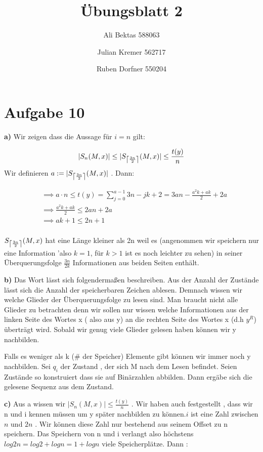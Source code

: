\documentclass{article}
\title{Übungsblatt 2}
\author{Ali Bektas 588063 \and Julian Kremer 562717 \and Ruben Dorfner 550204}
\def\mathify#1{\ifmmode{#1}\else\mbox{$#1$}\fi} %
\newcommand{\ceil}[1]{\mathify{\left\lceil {#1}\right\rceil}}
\begin{document}
\maketitle

\section*{Aufgabe 10}
\vspace{10px}
\textbf{a)} Wir zeigen dass die Aussage für $i=n$ gilt:

\[ |S_n(M,x)| \leq |S_{\ceil{\frac{3n}{2}}}(M,x)| \leq \frac{t(y)}{n}  \] 
Wir definieren $ a:=  |S_{\ceil{\frac{3n}{2}}}(M,x)|  $ . Dann:
 
\begin{align*}
	&\implies a \cdot n  \leq t(y) = \sum_{j=0}^{a-1} 3n-jk+2 = 3an - \frac{a^2k + ak}{2} + 2a \\
	&\implies \frac{a^2k +ak}{2} \leq 2an+2a \\
	&\implies ak +1 \leq 2n +1\\
\end{align*}

$S_{\ceil{\frac{3n}{2}}}(M,x) $ hat eine Länge kleiner als 2n weil es (angenommen wir speichern nur eine Information 'also $k=1$, für  $k>1$ ist es noch leichter zu sehen) in seiner Überquerungsfolge  $\frac{3n}{2k}$ Informationen aus beiden Seiten enthält.

\vspace{10px}

\textbf{b)} Das Wort lässt sich folgendermaßen beschreiben. Aus der Anzahl der Zustände lässt sich die Anzahl der speicherbaren Zeichen ablesen. Demnach wissen wir welche Glieder der Überquerungsfolge zu lesen sind. Man braucht nicht alle Glieder zu betrachten denn wir sollen nur wissen welche Informationen aus der linken Seite des Wortes x ( also aus y) an die rechten Seite des Wortes x (d.h $y^{\textit{R} }$) überträgt wird. Sobald wir genug viele Glieder gelesen haben können wir y nachbilden.

Falls es weniger als k (\# der Speicher) Elemente gibt können wir immer noch y nachbilden. Sei $q_i$ der Zustand , der sich M nach dem Lesen befindet. Seien Zustände so konstruiert dass sie auf Binärzahlen abbilden. Dann ergäbe sich die gelesene Sequenz aus dem Zustand.


\vspace{10px}

\textbf{c)} Aus a wissen wir  $  |S_n(M,x)|  \leq \frac{t(y)}{n} $ . Wir haben auch festgestellt , dass wir n und i kennen müssen um y später nachbilden zu können.$ i$ ist eine Zahl zwischen $n$ und $2n$ .  Wir können diese Zahl nur bestehend aus seinem Offset zu n speichern. Das Speichern von n und i verlangt also höchstens $log 2n = log 2 + log n = 1 + log n$ viele Speicherplätze. Dann :
\end{document}
